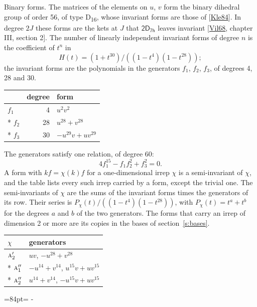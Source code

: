 \documentclass[10pt,a4paper]{article}
\makeatletter
\renewcommand\paragraph{\@startsection{paragraph}{4}{\z@}{1.5ex plus .5ex minus .2ex}{-1em}%
  {\normalfont\small\sffamily\bfseries\color{parttitle}}}
\newcommand{\needspace}[1]{\par\penalty-100\begingroup\dimen0=#1\relax\dimen2=\pagegoal
  \advance\dimen2-\pagetotal\ifdim\dimen0>\dimen2\relax\ifdim\dimen2>0pt\vfil\break\fi\fi
  \endgroup}
\numberwithin{equation}{section}
\newcommand{\grp}[1]{\mathsf{#1}}
\newcommand{\irr}[1]{\text{\normalfont\scshape #1}}
\makeatother
\begin{document}
\paragraph{Binary forms.}
The matrices of the elements on $u$, $v$ form the binary dihedral group of order 56, of type D\textsubscript{16}, whose invariant forms are those of [\href{../../../REFERENCES.pdf\#ref.Kle84}{Kle84}]. In degree $2J$ these forms are the kets at $J$ that $\grp{2D_{7h}}$ leaves invariant [\href{../../../REFERENCES.pdf\#ref.Vil68}{Vil68}, chapter III, section 2]. \label{n:head.degree}\label{n:head.form}The number of linearly independent invariant forms of degree $n$ is the coefficient of $t^n$ in
\begin{equation}\label{e:molien}H(t) = (1 + t^{30})/((1-t^{4})(1-t^{28}));\end{equation}
the invariant forms are the polynomials in the generators $f_1$, $f_2$, $f_3$, of degrees 4, 28 and 30.
{\small\begin{longtable}{@{}lrl@{}}\toprule
& degree & form\\\midrule\endhead
\bottomrule\endfoot\endlastfoot
$f_{1}$ & 4 & $u^{2}v^{2}$\\*
$f_{2}$ & 28 & $u^{28} + v^{28}$\\*
$f_{3}$ & 30 & $-u^{29}v + uv^{29}$\\
\bottomrule\end{longtable}}
The generators satisfy one relation, of degree 60:
\begin{equation}\label{e:relation}4f_{1}^{15} - f_{1}f_{2}^{2} + f_{3}^{2} = 0.\end{equation}
A form with $k f = \chi(k) f$ for a one-dimensional irrep $\chi$ is a semi-invariant of $\chi$, and the table lists every such irrep carried by a form, except the trivial one. \label{n:head.generators}The semi-invariants of $\chi$ are the sums of the invariant forms times the generators of its row. Their series is $P_\chi(t)/((1-t^{4})(1-t^{28}))$, with $P_\chi(t) = t^{a} + t^{b}$ for the degrees $a$ and $b$ of the two generators. The forms that carry an irrep of dimension 2 or more are its copies in the bases of section~\ref{s:bases}.
{\small\begin{longtable}{@{}ll@{}}\toprule
$\chi$ & generators\\\midrule\endhead
\bottomrule\endfoot\endlastfoot
$\irr{a}_{2}'$ & $uv$, $-u^{28} + v^{28}$\\*
$\irr{a}_{1}''$ & $-u^{14} + v^{14}$, $u^{15}v + uv^{15}$\\*
$\irr{a}_{2}''$ & $u^{14} + v^{14}$, $-u^{15}v + uv^{15}$\\
\bottomrule\end{longtable}}
\needspace{84pt}
\end{document}

